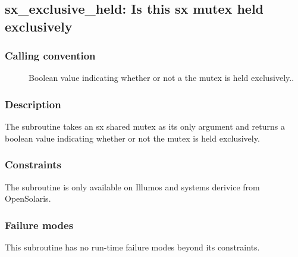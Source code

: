 \clearpage
{}
{}
\label{subr:sx-exclusive-held}
\subsection*{sx\_exclusive\_held: Is this sx mutex held exclusively }

\subsubsection*{Calling convention}

\begin{description}
\item[] Boolean value indicating whether or not a
  the mutex is held exclusively..
\end{description}

\subsubsection*{Description}

The  subroutine takes an sx shared mutex
as its only argument and returns a boolean value indicating whether or
not the mutex is held exclusively.

\subsubsection*{Constraints}

The  subroutine is only available on Illumos and
systems derivice from OpenSolaris.

\subsubsection*{Failure modes}

This subroutine has no run-time failure modes beyond its constraints.
